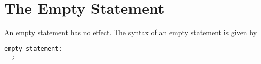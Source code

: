 \section{The Empty Statement}
\label{The_Empty_Statement}

An empty statement has no effect.  The syntax of an empty statement is
given by
\begin{syntax}
\begin{verbatim}
empty-statement:
  ;
\end{verbatim}
\end{syntax}
